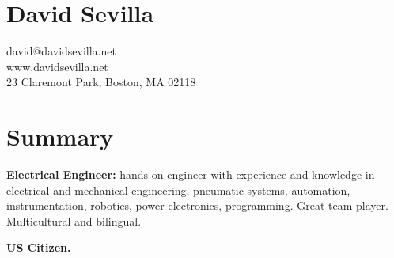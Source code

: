 \documentclass[10 pt, oneside, letter]{extarticle}
\begin{document}
\centering
\section*{\bf David Sevilla}\vspace{-2ex}
{david@davidsevilla.net}\\
{www.davidsevilla.net}\\
23 Claremont Park, Boston, MA 02118\\ \vspace{-2ex}
\raggedright
{}
\vspace{-2 ex}
\section*{Summary}\vspace{-2ex}
{\bf Electrical Engineer:} hands-on engineer with experience and knowledge in electrical and mechanical engineering, pneumatic systems, automation, instrumentation, robotics, power electronics, programming.  Great team player. Multicultural and bilingual. \vspace{-1ex}\begin{center}
 {\bf US Citizen.}
\end{center}  \vspace{-1ex}




\vspace*{-3ex}
\end{document}
